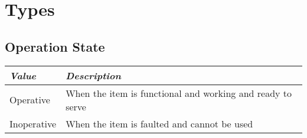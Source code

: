 \section{Types}

%


\subsection{Operation State}
\label{types:OperationState}

\begin{tabularx}{\linewidth}{ | l | X | }
  \hline
  \textit{Value} & \textit{Description} \\
  \hline \hline
  Operative 		& When the item is functional and working and ready to serve \\
  Inoperative 	& When the item is faulted and cannot be used \\
  \hline
\end{tabularx}

%
